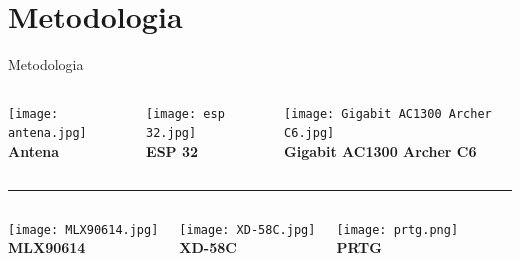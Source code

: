 \documentclass[10pt]{beamer}
\begin{document}
\section{Metodologia}
\begin{frame}{Metodologia}

\centering
\normalsize 


\begin{columns}[T,onlytextwidth]
  \centering
  \texttt{[image: antena.jpg]}\\[0.2cm] 
  \textbf{Antena}

  \centering
  \texttt{[image: esp 32.jpg]}\\[0.2cm]
  \textbf{ESP 32}

  \centering
  \texttt{[image: Gigabit AC1300 Archer C6.jpg]}\\[0.2cm]
  \textbf{Gigabit AC1300 Archer C6}
\end{columns}

\vspace{0.3cm} 
\textcolor{verdeBuba}{\rule{0.9\linewidth}{0.8pt}}
\vspace{0.3cm}

\begin{columns}[T,onlytextwidth]
  \centering
  \texttt{[image: MLX90614.jpg]}\\[0.2cm]
  \textbf{MLX90614}

  \centering
  \texttt{[image: XD-58C.jpg]}\\[0.2cm]
  \textbf{XD-58C}

  \centering
  \texttt{[image: prtg.png]}\\[0.2cm]
  \textbf{PRTG}
\end{columns}

\end{frame}




\end{document}
